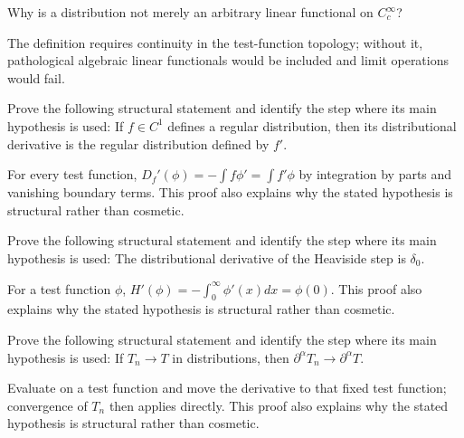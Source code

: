 \begin{problem}\label{prob:iii16-problem-08}
Why is a distribution not merely an arbitrary linear functional on \(C_c^\infty\)?
\end{problem}
\begin{solution}
The definition requires continuity in the test-function topology; without
it, pathological algebraic linear functionals would be included and limit
operations would fail.
\end{solution}

\begin{problem}\label{prob:iii16-problem-09}
Prove the following structural statement and identify the step where its main hypothesis is used: If $f\in C^1$ defines a regular distribution, then its distributional derivative is the regular distribution defined by $f'$.
\end{problem}
\begin{solution}
For every test function, $D_f'(\phi)=-\int f\phi'=\int f'\phi$ by integration by parts and vanishing boundary terms. This proof also explains why the stated hypothesis is structural rather than cosmetic.
\end{solution}

\begin{problem}\label{prob:iii16-problem-10}
Prove the following structural statement and identify the step where its main hypothesis is used: The distributional derivative of the Heaviside step is $\delta_0$.
\end{problem}
\begin{solution}
For a test function $\phi$, $H'(\phi)=-\int_0^\infty\phi'(x)dx=\phi(0)$. This proof also explains why the stated hypothesis is structural rather than cosmetic.
\end{solution}

\begin{problem}\label{prob:iii16-problem-11}
Prove the following structural statement and identify the step where its main hypothesis is used: If $T_n\to T$ in distributions, then $\partial^\alpha T_n\to\partial^\alpha T$.
\end{problem}
\begin{solution}
Evaluate on a test function and move the derivative to that fixed test function; convergence of $T_n$ then applies directly. This proof also explains why the stated hypothesis is structural rather than cosmetic.
\end{solution}

